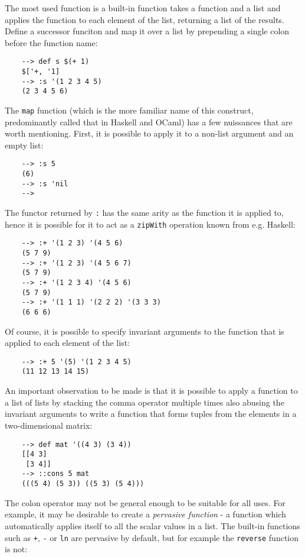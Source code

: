 The most used function is a built-in function takes a function and a list and applies the function to each element of the list, returning a list of the results. Define a successor funciton and map it over a list by prepending a single colon before the function name:

\begin{Verbatim}
    --> def s $(+ 1)
    $['+, '1]
    --> :s '(1 2 3 4 5)
    (2 3 4 5 6)
\end{Verbatim}

The \verb|map| function (which is the more familiar name of this construct, predominantly called that in Haskell and OCaml) has a few nuissances that are worth mentioning. First, it is possible to apply it to a non-list argument and an empty list:

\begin{Verbatim}
    --> :s 5
    (6)
    --> :s 'nil
    -->
\end{Verbatim}

The functor returned by \verb|:| has the same arity as the function it is applied to, hence it is possible for it to act as a \verb|zipWith| operation known from e.g. Haskell:

\begin{Verbatim}
    --> :+ '(1 2 3) '(4 5 6)
    (5 7 9)
    --> :+ '(1 2 3) '(4 5 6 7)
    (5 7 9)
    --> :+ '(1 2 3 4) '(4 5 6)
    (5 7 9)
    --> :+ '(1 1 1) '(2 2 2) '(3 3 3)
    (6 6 6)
\end{Verbatim}

Of course, it is possible to specify invariant arguments to the function that is applied to each element of the list:

\begin{Verbatim}
    --> :+ 5 '(5) '(1 2 3 4 5)
    (11 12 13 14 15)
\end{Verbatim}

An important observation to be made is that it is possible to apply a function to a list of lists by stacking the comma operator multiple times also abusing the invariant arguments to write a function that forms tuples from the elements in a two-dimensional matrix:

\begin{Verbatim}
    --> def mat '((4 3) (3 4))
    [[4 3]
     [3 4]]
    --> ::cons 5 mat
    (((5 4) (5 3)) ((5 3) (5 4)))
\end{Verbatim}

The colon operator may not be general enough to be suitable for all uses. For example, it may be desirable to create a \textit{pervasive function} - a function which automatically applies itself to all the scalar values in a list. The built-in functions such as \verb|+|, \verb|-| or \verb|ln| are pervasive by default, but for example the \verb|reverse| function is not:

